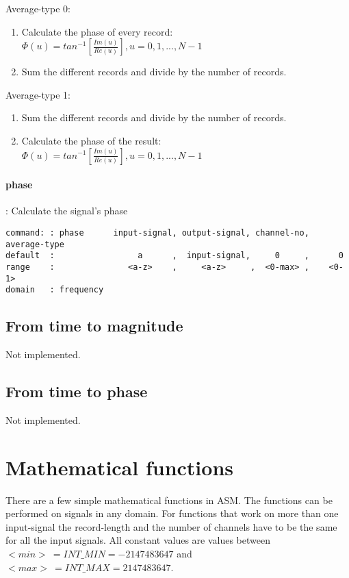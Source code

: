 \documentclass{report}
\newcommand{\bc}{\scriptsize}
\newcommand{\ec}{\normalsize}
\begin{document}
Average-type 0:

\begin{enumerate}
\item Calculate the phase of every record:\\
  \( \Phi(u) = tan^{-1}\left[ \frac{Im(u)}{Re(u)}\right],  u = 0, 1, ..., N-1\)
\item Sum the different records and divide by the number of records.
\end{enumerate}

Average-type 1:

\begin{enumerate}
\item Sum the different records and divide by the number of records.
\item Calculate the phase of the result:\\
   \( \Phi(u) = tan^{-1}\left[ \frac{Im(u)}{Re(u)}\right],  u = 0, 1, ..., N-1 \)
\end{enumerate}
\ec
\paragraph{phase}: Calculate the signal's phase

\bc
\begin{verbatim}
command: : phase      input-signal, output-signal, channel-no, average-type
default  :                 a      ,  input-signal,     0     ,      0
range    :               <a-z>    ,     <a-z>     ,  <0-max> ,    <0-1>
domain   : frequency
\end{verbatim}
\ec

\subsection{From time to magnitude}

Not implemented.

\subsection{From time to phase}

Not implemented.

\section{Mathematical functions}

There are a few simple mathematical functions in ASM. The functions
can be performed on signals in any domain. For functions that work
on more than one input-signal the record-length and the number of
channels have to be the same for all the input signals. All
constant values are values between $<min> ~ = INT\_MIN = -2147483647 $
and $ <max> ~ = INT\_MAX = 2147483647 $.
\end{document}
